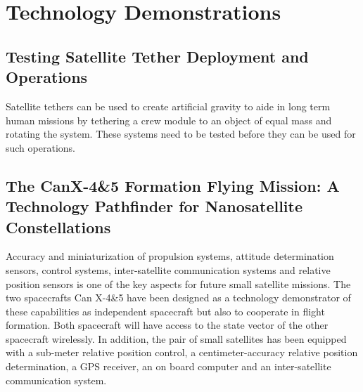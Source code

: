 \section{Technology Demonstrations}

\subsection{Testing Satellite Tether Deployment and Operations}
\label{tether}

Satellite tethers can be used to create artificial gravity to aide in long term human missions by tethering a crew module to an object of equal mass and rotating the system. These systems need to be tested before they can be used for such operations. \cite{Ref:Carlson}\cite{Ref:Mazzoleni}

\subsection{The CanX-4\&5 Formation Flying Mission: A Technology Pathfinder for Nanosatellite Constellations}
\label{canx4}

Accuracy and miniaturization of propulsion systems, attitude determination
sensors, control systems, inter-satellite communication systems and
relative position sensors is one of the key aspects for future small
satellite missions. The two spacecrafts Can X-4\&5 have been designed
as a technology demonstrator of these capabilities as independent
spacecraft but also to cooperate in flight formation. Both spacecraft
will have access to the state vector of the other spacecraft wirelessly.
In addition, the pair of small satellites has been equipped with a
sub-meter relative position control, a centimeter-accuracy relative
position determination, a GPS receiver, an on board computer and an
inter-satellite communication system.\cite{Bonin_FF_CanX-4&5}
